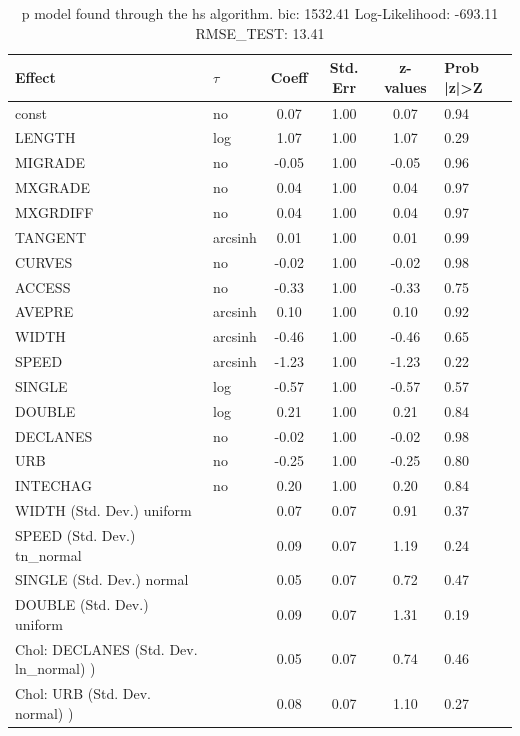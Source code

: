 \begin{table}
	\caption{p model found through the hs algorithm. bic: 1532.41 Log-Likelihood: -693.11 RMSE_TEST: 13.41}
	\begin{center}
		\begin{tabular}{|l|l|c|c|c|l|}
			\hline
			Effect & $\tau$ & Coeff & Std. Err & z-values & Prob |z|>Z \\
			\hline
			const & no & 0.07 & 1.00 & 0.07 & 0.94 \\
			\hline
			LENGTH & log & 1.07 & 1.00 & 1.07 & 0.29 \\
			\hline
			MIGRADE & no & -0.05 & 1.00 & -0.05 & 0.96 \\
			\hline
			MXGRADE & no & 0.04 & 1.00 & 0.04 & 0.97 \\
			\hline
			MXGRDIFF & no & 0.04 & 1.00 & 0.04 & 0.97 \\
			\hline
			TANGENT & arcsinh & 0.01 & 1.00 & 0.01 & 0.99 \\
			\hline
			CURVES & no & -0.02 & 1.00 & -0.02 & 0.98 \\
			\hline
			ACCESS & no & -0.33 & 1.00 & -0.33 & 0.75 \\
			\hline
			AVEPRE & arcsinh & 0.10 & 1.00 & 0.10 & 0.92 \\
			\hline
			WIDTH & arcsinh & -0.46 & 1.00 & -0.46 & 0.65 \\
			\hline
			SPEED & arcsinh & -1.23 & 1.00 & -1.23 & 0.22 \\
			\hline
			SINGLE & log & -0.57 & 1.00 & -0.57 & 0.57 \\
			\hline
			DOUBLE & log & 0.21 & 1.00 & 0.21 & 0.84 \\
			\hline
			DECLANES & no & -0.02 & 1.00 & -0.02 & 0.98 \\
			\hline
			URB & no & -0.25 & 1.00 & -0.25 & 0.80 \\
			\hline
			INTECHAG & no & 0.20 & 1.00 & 0.20 & 0.84 \\
			\hline
			WIDTH (Std. Dev.) uniform &  & 0.07 & 0.07 & 0.91 & 0.37 \\
			\hline
			SPEED (Std. Dev.) tn_normal &  & 0.09 & 0.07 & 1.19 & 0.24 \\
			\hline
			SINGLE (Std. Dev.) normal &  & 0.05 & 0.07 & 0.72 & 0.47 \\
			\hline
			DOUBLE (Std. Dev.) uniform &  & 0.09 & 0.07 & 1.31 & 0.19 \\
			\hline
			 Chol: DECLANES (Std. Dev. ln_normal) ) &  & 0.05 & 0.07 & 0.74 & 0.46 \\
			\hline
			 Chol: URB (Std. Dev. normal) ) &  & 0.08 & 0.07 & 1.10 & 0.27 \\

\end{tabular}
\end{center}
\end{table}
